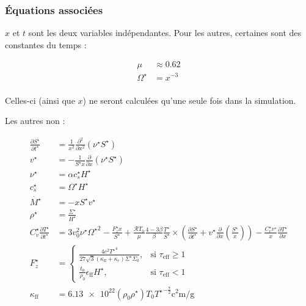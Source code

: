 \subsubsection{Équations associées}

$x$ et $t$ sont les deux variables indépendantes. Pour les autres, certaines sont des constantes du temps :

\begin{align}
    \mu &\approx 0.62 \\
    \Omega^\star &= x^{-3} \\ 
\end{align}

Celles-ci (ainsi que $x$) ne seront calculées qu’une seule fois dans la simulation.

Les autres non :

\begin{align}
    \frac{\partial S^\star}{\partial t^\star} &= \frac{1}{x^2} \frac{\partial^2}{\partial x^2} \left(\nu^\star S^\star\right) \\
    v^\star &= - \frac{1}{S^\star x} \frac{\partial}{\partial x} \left(\nu^\star S^\star\right) \\
    \nu^\star &= \alpha c_s^\star H^\star \\
    c_s^\star &= \Omega^\star H^\star \\
    \dot{M^\star} &= - x S^\star v^\star \\
    \rho^\star &= \frac{\Sigma^\star}{H^\star} \\
    C_v^\star \frac{\partial T^{\star}}{\partial t^{\star}} &=
    3 v_0^2 \nu^\star {\Omega^\star}^2 - \frac{F_z^\star x}{S^\star} +
    \frac{\mathcal{R} T_0}{\mu} \frac{4-3\beta}{\beta} \frac{T^\star}{S^\star} \times
    \left( \frac{\partial S^\star}{\partial t^\star} + v^\star \frac{\partial}{\partial x} \left(\frac{S^\star}{x}\right) \right) -
    \frac{C_v^\star v^\star}{x} \frac{\partial T^\star}{\partial x} \\
    F_z^\star &=
    \begin{cases}
        \frac{4 c^2 {T^\star}^4}{27 \sqrt{3} (\kappa_\mathrm{ff} + \kappa_e)\Sigma^\star \Sigma_0}, &\text{si $\tau_\mathrm{eff} \geq 1$} \\
        \frac{t_0}{\rho_0}\epsilon_\mathrm{ff} H^\star, &\text{si $\tau_\mathrm{eff} < 1$}
    \end{cases} \\
    \kappa_\mathrm{ff} &= \num{6.13e22} (\rho_0 \rho^\star) {T_0 T^\star}^{-\frac{7}{2}} \si{\square\centi\meter\per\gram} \\

\end{align}
